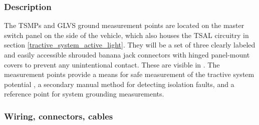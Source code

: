 \documentclass{article}
\begin{document}
\subsubsection{Description}
The TSMPs and GLVS ground measurement points are located on the master switch panel on the side of the vehicle, which also houses the TSAL circuitry in section \ref{tractive_system_active_light}. They will be a set of three clearly labeled and easily accessible shrouded banana jack connectors with hinged panel-mount covers to prevent any unintentional contact. These are visible in . The measurement points provide a means for safe measurement of the tractive system potential , a secondary manual method for detecting isolation faults, and a reference point for system grounding  measurements. 


\subsubsection{Wiring, connectors, cables}
\end{document}
